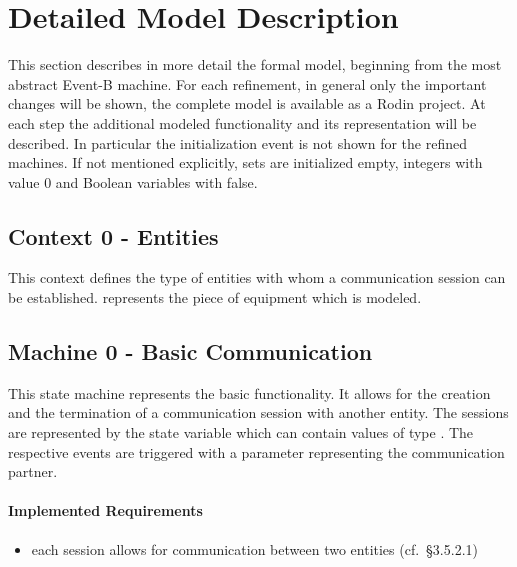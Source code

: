 \documentclass{template/openetcs_article}
\begin{document}
\section{Detailed Model Description}
\label{sec:deta-model-descr}

This section describes in more detail the formal model, beginning from the most
abstract Event-B machine. For each refinement, in general only the important
changes will be shown, the complete model is available as a Rodin project. At
each step the additional modeled functionality and its representation will be
described.  In particular the initialization event is not shown for the refined
machines. If not mentioned explicitly, sets are initialized empty, integers with
value 0 and Boolean variables with false.


\subsection{Context 0 - Entities}
\label{sec:context-0-entities}

This context defines the type of entities with whom a communication session can
be established.   represents the piece of equipment which is
modeled.



\subsection{Machine 0 - Basic Communication}
\label{sec:machine-0-basic}

This state machine represents the basic functionality. It allows for the
creation and the termination of a communication session with another entity. The
sessions are represented by the state variable  which can contain
values of type . The respective events are triggered with a
parameter  representing the communication partner.

\paragraph{Implemented Requirements}
\label{sec:impl-requ}

\begin{itemize}
\item each session allows for communication between two entities (cf.~§3.5.2.1)
\end{itemize}


\end{document}
